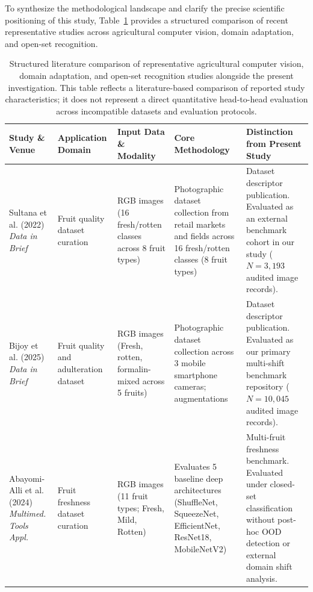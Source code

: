 To synthesize the methodological landscape and clarify the precise scientific positioning of this study, Table~\ref{tab:literature_comparison} provides a structured comparison of recent representative studies across agricultural computer vision, domain adaptation, and open-set recognition.

\begin{table}[!t]
\caption{Structured literature comparison of representative agricultural computer vision, domain adaptation, and open-set recognition studies alongside the present investigation. This table reflects a literature-based comparison of reported study characteristics; it does not represent a direct quantitative head-to-head evaluation across incompatible datasets and evaluation protocols.}
\label{tab:literature_comparison}
\centering
\footnotesize
\setlength{\tabcolsep}{2.5pt}
\begin{tabular}{>{\raggedright\arraybackslash}p{2.4cm} >{\raggedright\arraybackslash}p{2.3cm} >{\raggedright\arraybackslash}p{2.6cm} >{\raggedright\arraybackslash}p{3.5cm} >{\raggedright\arraybackslash}p{4.2cm}}
\toprule
\textbf{Study \& Venue} & \textbf{Application Domain} & \textbf{Input Data \& Modality} & \textbf{Core Methodology} & \textbf{Distinction from Present Study} \\
\midrule
Sultana et al. (2022) \cite{sultana2022extensive} \newline \textit{Data in Brief} & Fruit quality dataset curation & RGB images \newline (16 fresh/rotten classes across 8 fruit types) & Photographic dataset collection from retail markets and fields across 16 fresh/rotten classes (8 fruit types) & Dataset descriptor publication. Evaluated as an external benchmark cohort in our study ($N=3,193$ audited image records). \\
\addlinespace[3pt]
Bijoy et al. (2025) \cite{bijoy2025fruitvision} \newline \textit{Data in Brief} & Fruit quality and adulteration dataset & RGB images \newline (Fresh, rotten, formalin-mixed across 5 fruits) & Photographic dataset collection across 3 mobile smartphone cameras; augmentations & Dataset descriptor publication. Evaluated as our primary multi-shift benchmark repository ($N=10,045$ audited image records). \\
\addlinespace[3pt]
Abayomi-Alli et al. (2024) \cite{abayomi2024fruitq} \newline \textit{Multimed. Tools Appl.} & Fruit freshness dataset curation & RGB images \newline (11 fruit types; Fresh, Mild, Rotten) & Evaluates 5 baseline deep architectures (ShuffleNet, SqueezeNet, EfficientNet, ResNet18, MobileNetV2) & Multi-fruit freshness benchmark. Evaluated under closed-set classification without post-hoc OOD detection or external domain shift analysis. \\

\end{tabular}
\end{table}
